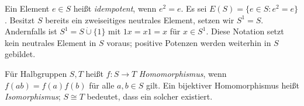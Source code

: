 \begin{definition}
Ein Element $e\in S$ heißt \emph{idempotent}, wenn $e^2=e$.
Es sei $E(S)=\{e\in S:e^2=e\}$.
Besitzt $S$ bereits ein zweiseitiges neutrales Element, setzen wir
$S^1=S$. Andernfalls ist $S^1=S\mathbin{\dot\cup}\{1\}$ mit
$1x=x1=x$ für $x\in S^1$. Diese Notation setzt kein neutrales Element
in $S$ voraus; positive Potenzen werden weiterhin in $S$ gebildet.
\end{definition}

\begin{definition}
Für Halbgruppen $S,T$ heißt $f:S\to T$ \emph{Homomorphismus}, wenn
$f(ab)=f(a)f(b)$ für alle $a,b\in S$ gilt. Ein bijektiver
Homomorphismus heißt \emph{Isomorphismus}; $S\cong T$ bedeutet,
dass ein solcher existiert.
\end{definition}
